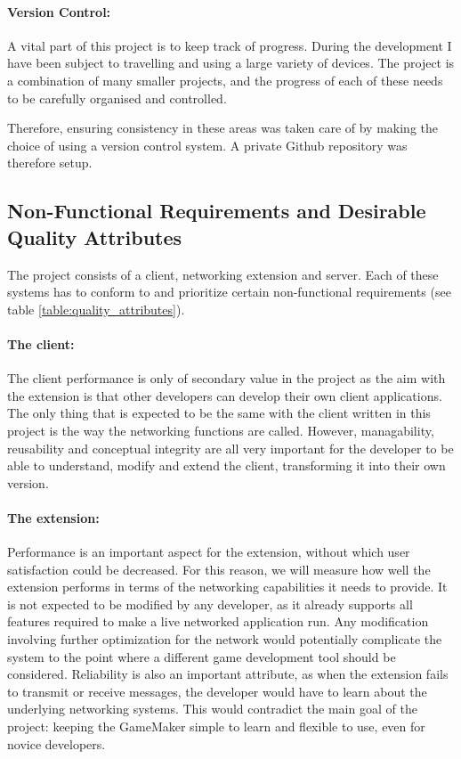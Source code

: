 \documentclass[bsc,frontabs,twoside,singlespacing,parskip,deptreport]{infthesis}     %
\begin{document}
\paragraph*{Version Control:}
A vital part of this project is to keep track of progress. During the development I have been subject to travelling and using a large variety of devices. The project is a combination of many smaller projects, and the progress of each of these needs to be carefully organised and controlled.

Therefore, ensuring consistency in these areas was taken care of by making the choice of using a version control system. A private Github \cite{github} repository was therefore setup.

\subsection{Non-Functional Requirements and Desirable Quality Attributes}
The project consists of a client, networking extension and server. Each of these systems has to conform to and prioritize certain non-functional requirements (see table \ref{table:quality_attributes}).

\paragraph*{The client:}
The client performance is only of secondary value in the project as the aim with the extension is that other developers can develop their own client applications. The only thing that is expected to be the same with the client written in this project is the way the networking functions are called. However, managability, reusability and conceptual integrity are all very important for the developer to be able to understand, modify and extend the client, transforming it into their own version.

\paragraph*{The extension:}
Performance is an important aspect for the extension, without which user satisfaction could be decreased. For this reason, we will measure how well the extension performs in terms of the networking capabilities it needs to provide. It is not expected to be modified by any developer, as it already supports all features required to make a live networked application run. Any modification involving further optimization for the network would potentially complicate the system to the point where a different game development tool should be considered. Reliability is also an important attribute, as when the extension fails to transmit or receive messages, the developer would have to learn about the underlying networking systems. This would contradict the main goal of the project: keeping the GameMaker simple to learn and flexible to use, even for novice developers.
\end{document}
